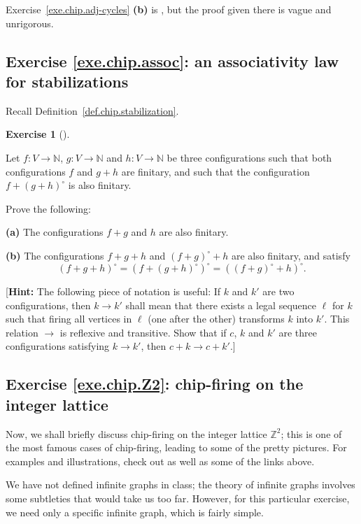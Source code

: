 \documentclass[numbers=enddot,12pt,final,onecolumn,notitlepage]{scrartcl}%
\newcounter{exer}
\theoremstyle{definition}
\newtheorem{exmp}[exer]{Exercise}
\newenvironment{exercise}[1][]
{\begin{exmp}[#1]\begin{leftbar}}
{\end{leftbar}\end{exmp}}
\newcommand{\NN}{\mathbb{N}}
\newcommand{\ZZ}{\mathbb{Z}}
\newcommand{\tup}[1]{\left( #1 \right)}
\begin{document}
Exercise~\ref{exe.chip.adj-cycles} \textbf{(b)} is
\cite[Theorem 2.2]{BjoLov92}, but the proof given there
is vague and unrigorous.

\subsection{Exercise \ref{exe.chip.assoc}: an associativity
law for stabilizations}

Recall Definition~\ref{def.chip.stabilization}.

\begin{exercise} \label{exe.chip.assoc}
Let $f : V \to \NN$, $g : V \to \NN$ and $h : V \to \NN$
be three configurations such that both configurations
$f$ and $g + h$ are finitary, and such that the
configuration $f + \tup{g + h}^\circ$ is also finitary.

Prove the following:

\textbf{(a)} The configurations $f + g$ and $h$ are also
finitary.

\textbf{(b)} The configurations $f + g + h$ and
$\tup{f + g}^\circ + h$ are also finitary, and
satisfy
\[
\tup{f + g + h}^\circ
= \tup{f + \tup{g + h}^\circ}^\circ
= \tup{\tup{f + g}^\circ + h}^\circ .
\]

[\textbf{Hint:} The following piece of notation is
useful:
If $k$ and $k'$ are two configurations, then
$k \to k'$ shall mean that there exists a legal
sequence $\ell$ for $k$ such that firing all vertices
in $\ell$ (one after the other) transforms $k$ into
$k'$.
This relation $\to$ is reflexive and transitive.
Show that if $c$, $k$ and $k'$ are three configurations
satisfying $k \to k'$, then $c + k \to c + k'$.]
\end{exercise}

\subsection{Exercise \ref{exe.chip.Z2}: chip-firing on
the integer lattice}

Now, we shall briefly discuss chip-firing on the
integer lattice $\ZZ^2$; this is one of the most famous
cases of chip-firing, leading to some of the pretty
pictures.
For examples and illustrations, check out
\cite{Ellenb15} as well as some of the links above.

We have not defined infinite graphs in class; the
theory of infinite graphs involves some subtleties that
would take us too far.
However, for this particular exercise, we need only a
specific infinite graph, which is fairly simple.
\end{document}
